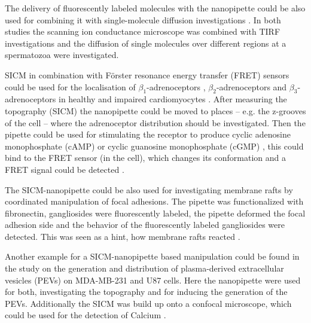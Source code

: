 The delivery of fluorescently labeled molecules with the nanopipette could be also used for 
combining it with single-molecule diffusion investigations \cite{Bruckbauer2007, Bruckbauer2010}. 
In both studies the scanning ion conductance microscope was combined with TIRF investigations and 
the diffusion of single molecules over different regions at a spermatozoa were investigated. 

SICM in combination with Förster resonance energy transfer (FRET) sensors could be used for
the localisation of $\beta_{1}$-adrenoceptors \cite{Wright2018}, $\beta_{2}$-adrenoceptors 
\cite{Nikolaev2010,Lyon2012,Wright2014,Wright2018} and $\beta_{3}$-adrenoceptors 
\cite{Schobesberger2020} in healthy and impaired cardiomyocytes \cite{Wright2015,Berisha2017}. 
After measuring the topography (SICM) the nanopipette could be moved to places -- e.g. the 
z-grooves of the cell \cite{Gorelik2006,Lyon2009,Miragoli2011,Lyon2012,Rivaud2017} -- where the 
adrenoceptor distribution should be investigated. Then the pipette could be used for stimulating 
the receptor to produce cyclic adenosine monophosphate (cAMP) or cyclic guanosine monophosphate 
(cGMP) \cite{Xiang2003}, this could bind to the FRET sensor (in the cell), which changes its 
conformation and a FRET signal could be detected \cite{Nikolaev2010}.

The SICM-nanopipette could be also used for investigating membrane rafts 
\cite{Simons1997,Pike2006} by coordinated manipulation of focal adhesions. The pipette was 
functionalized with fibronectin, gangliosides were fluorescently labeled, the pipette deformed the 
focal adhesion side and the behavior of the fluorescently labeled gangliosides were detected. This 
was seen as a hint, how membrane rafts reacted \cite{Fuentes2012}. 

Another example for a SICM-nanopipette based manipulation could be found in the study on the 
generation and distribution of plasma-derived extracellular vesicles (PEVs) on MDA-MB-231 and U87 
cells. Here the nanopipette were used for both, investigating the topography and for inducing the 
generation of the PEVs. Additionally the SICM was build up onto a confocal microscope, which could 
be used for the detection of Calcium \cite{Wang2020}.


